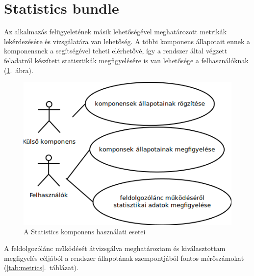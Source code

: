 

\section{Statistics bundle}
\label{sec:statisticsbundle}

Az alkalmazás felügyeletének másik lehetőségével meghatározott metrikák lekérdezésére és vizsgálatára van lehetőség. A többi komponens állapotait ennek a komponensnek a segítségével teheti elérhetővé, így a rendszer által végzett feladatról készített statisztikák megfigyelésére is van lehetősége a felhasználóknak (\ref{fig:usecase_statistics}.~ábra).

\begin{figure}[htp]
\centering
\includegraphics[scale=0.6]{img/usecase_statistics}
\caption{A Statistics komponens használati esetei}
\label{fig:usecase_statistics}
\end{figure} 

A feldolgozólánc működését átvizsgálva meghatároztam és kiválasztottam megfigyelés céljából a rendszer állapotának szempontjából fontos mérőszámokat (\ref{tab:metrics}.~táblázat).

